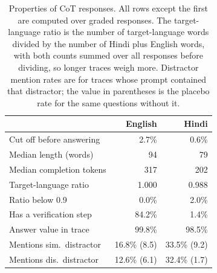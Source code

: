 \begin{table}[t]
\centering
\small
\setlength{\tabcolsep}{4pt}
\begin{tabular}{lrr}
\toprule
 & English & Hindi \\
\midrule
Cut off before answering & 2.7\% & 0.6\% \\
Median length (words) & 94 & 79 \\
Median completion tokens & 317 & 202 \\
Target-language ratio & 1.000 & 0.988 \\
Ratio below 0.9 & 0.0\% & 2.0\% \\
Has a verification step & 84.2\% & 1.4\% \\
Answer value in trace & 99.8\% & 98.5\% \\
Mentions sim.\ distractor & 16.8\% (8.5) & 33.5\% (9.2) \\
Mentions dis.\ distractor & 12.6\% (6.1) & 32.4\% (1.7) \\
\bottomrule
\end{tabular}
\caption{Properties of CoT responses. All rows except the first are computed over graded responses. The target-language ratio is the number of target-language words divided by the number of Hindi plus English words, with both counts summed over all responses before dividing, so longer traces weigh more. Distractor mention rates are for traces whose prompt contained that distractor; the value in parentheses is the placebo rate for the same questions without it.}
\label{tab:trace}
\end{table}

